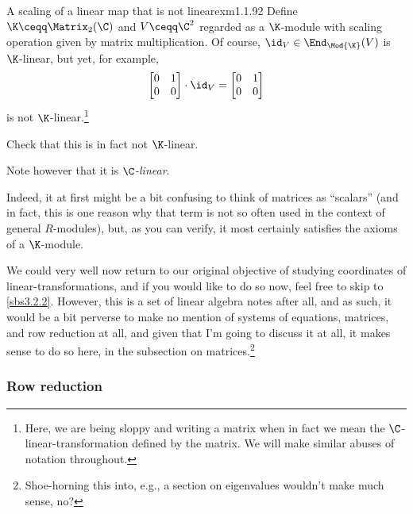 \begin{exm}{A scaling of a linear map that is not linear}{exm1.1.92}
	Define $\K \ceqq \Matrix _2(\C )$ and $V\ceqq \C ^2$ regarded as a $\K$-module with scaling operation given by matrix multiplication.  Of course, $\id _V\in \End _{\Mod{\K}}(V)$ is $\K$-linear, but yet, for example,
	\begin{equation}
	\begin{bmatrix}0 & 1 \\ 0 & 0\end{bmatrix}\cdot \id _V=\begin{bmatrix}0 & 1 \\ 0 & 0\end{bmatrix}
	\end{equation}
	is not $\K$-linear.\footnote{Here, we are being sloppy and writing a matrix when in fact we mean the $\C$-linear-transformation defined by the matrix.  We will make similar abuses of notation throughout.}
	\begin{exr}[breakable=false]{}{}
		Check that this is in fact not $\K$-linear.
		\begin{rmk}
			Note however that it is \emph{$\C$-linear}.
		\end{rmk}
	\end{exr}
	\begin{rmk}
		Indeed, it at first might be a bit confusing to think of matrices as ``scalars'' (and in fact, this is one reason why that term is not so often used in the context of general $R$-modules), but, as you can verify, it most certainly satisfies the axioms of a $\K$-module.
	\end{rmk}
\end{exm}

We could very well now return to our original objective of studying coordinates of linear-transformations, and if you would like to do so now, feel free to skip to \cref{sbs3.2.2}.  However, this is a set of linear algebra notes after all, and as such, it would be a bit perverse to make no mention of systems of equations, matrices, and row reduction at all, and given that I'm going to discuss it at all, it makes sense to do so here, in the subsection on matrices.\footnote{Shoe-horning this into, e.g., a section on eigenvalues wouldn't make much sense, no?}

\subsubsection{Row reduction}


